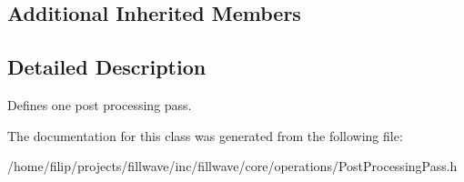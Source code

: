 \subsection*{Additional Inherited Members}


\subsection{Detailed Description}
Defines one post processing pass. 

The documentation for this class was generated from the following file\+:\begin{DoxyCompactItemize}
\item 
/home/filip/projects/fillwave/inc/fillwave/core/operations/Post\+Processing\+Pass.\+h\end{DoxyCompactItemize}
